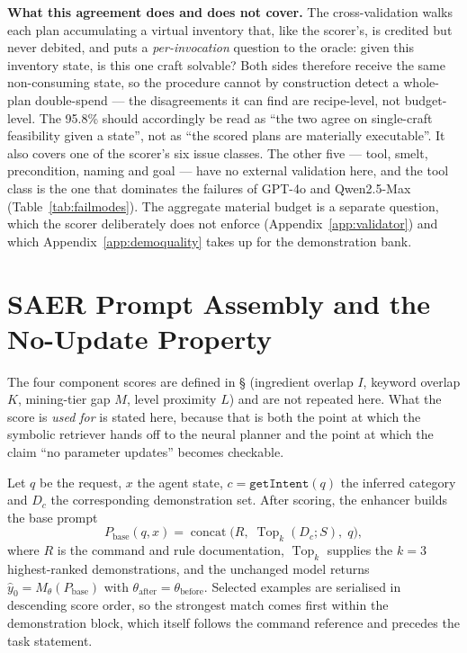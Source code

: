 \documentclass[letterpaper]{article} %
\newcommand{\appref}[1]{Appendix~\ref{#1}}
\newcommand{\bodyref}[1]{\getrefnumber{#1}}
\begin{document}
\noindent\textbf{What this agreement does and does not cover.}  The
cross-validation walks each plan accumulating a virtual inventory that,
like the scorer's, is credited but never debited, and puts a
\emph{per-invocation} question to the oracle: given this inventory
state, is this one craft solvable?  Both sides therefore receive the
same non-consuming state, so the procedure cannot by construction detect
a whole-plan double-spend --- the disagreements it can find are
recipe-level, not budget-level.  The 95.8\% should accordingly be read
as ``the two agree on single-craft feasibility given a state'', not as
``the scored plans are materially executable''.  It also covers one of the
scorer's six issue classes.  The other five --- tool, smelt, precondition,
naming and goal --- have no external validation here, and the tool class is
the one that dominates the failures of GPT-4o and Qwen2.5-Max
(Table~\ref{tab:failmodes}).  The aggregate material
budget is a separate question, which the scorer deliberately does not
enforce (\appref{app:validator}) and which
\appref{app:demoquality} takes up for the demonstration bank.

\section{SAER Prompt Assembly and the No-Update Property}
\label{app:prompt}

The four component scores are defined in \S\bodyref{sec:scoring}
(ingredient overlap $I$, keyword overlap $K$, mining-tier gap $M$, level
proximity $L$) and are not repeated here.  What the score is \emph{used
for} is stated here, because that is both the point at which the
symbolic retriever hands off to the neural planner and the point at
which the claim ``no parameter updates'' becomes checkable.

Let $q$ be the request, $x$ the agent state,
$c{=}\texttt{getIntent}(q)$ the inferred category and $D_c$ the
corresponding demonstration set.  After scoring, the enhancer builds the
base prompt
\begin{equation}
P_{\mathrm{base}}(q,x)=\operatorname{concat}\bigl(R,\;
\operatorname{Top}_k(D_c;S),\; q\bigr),
\label{eq:prompt}
\end{equation}
where $R$ is the command and rule documentation,
$\operatorname{Top}_k$ supplies the $k{=}3$ highest-ranked
demonstrations, and the unchanged model returns
$\hat y_0 = M_\theta(P_{\mathrm{base}})$ with
$\theta_{\mathrm{after}}=\theta_{\mathrm{before}}$.  Selected examples
are serialised in descending score order, so the strongest match comes
first within the demonstration block, which itself follows the command
reference and precedes the task statement.
\end{document}
